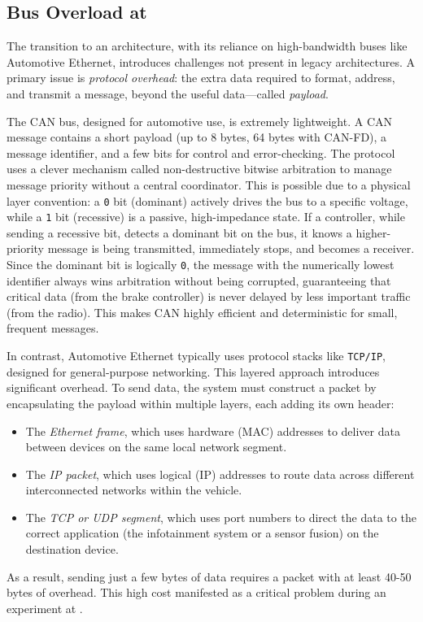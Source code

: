 \subsection{Bus Overload at \ampere}
\label{sec:intro:gap:bus_overload}

The transition to an \sdv architecture, with its reliance on high-bandwidth buses like Automotive
Ethernet, introduces challenges not present in legacy architectures. A primary issue is
\emph{protocol overhead}: the extra data required to format, address, and transmit a message, beyond
the useful data---called \emph{payload}.

The CAN bus, designed for automotive use, is extremely lightweight. A CAN message contains a short
payload (up to 8 bytes, 64 bytes with CAN-FD), a message identifier, and a few bits for control and
error-checking. The protocol uses a clever mechanism called non-destructive bitwise arbitration to
manage message priority without a central coordinator. This is possible due to a physical layer
convention: a \texttt{0} bit (dominant) actively drives the bus to a specific voltage, while a
\texttt{1} bit (recessive) is a passive, high-impedance state. If a controller, while sending a
recessive bit, detects a dominant bit on the bus, it knows a higher-priority message is being
transmitted, immediately stops, and becomes a receiver. Since the dominant bit is logically
\texttt{0}, the message with the numerically lowest identifier always wins arbitration without being
corrupted, guaranteeing that critical data (\eg from the brake controller) is never delayed by less
important traffic (\eg from the radio). This makes CAN highly efficient and deterministic
for small, frequent messages.

In contrast, Automotive Ethernet typically uses protocol stacks like \texttt{TCP/IP}, designed for
general-purpose networking. This layered approach introduces significant overhead. To send data, the
system must construct a packet by encapsulating the payload within multiple layers, each adding its
own header:
\begin{itemize}
    \item The \emph{Ethernet frame}, which uses hardware (MAC) addresses to deliver data between
          devices on the same local network segment.
    \item The \emph{IP packet}, which uses logical (IP) addresses to route data across different
          interconnected networks within the vehicle.
    \item The \emph{TCP or UDP segment}, which uses port numbers to direct the data to the correct
          application (\eg the infotainment system or a sensor fusion) on the destination device.
\end{itemize}
As a result, sending just a few bytes of data requires a packet with at least 40-50 bytes of
overhead. This high cost manifested as a critical problem during an experiment at \ampere.


